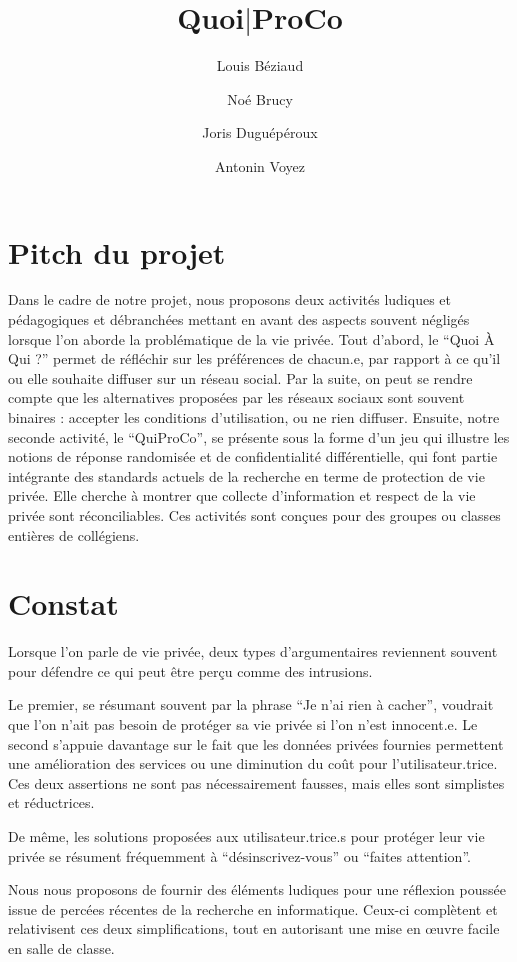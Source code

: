 \documentclass[a4paper]{article}
\title{\Huge\textbf{Quoi\(\mid\)ProCo}}
\author[1,2]{Louis Béziaud}
\author[1,2]{Noé Brucy}
\author[1,2]{Joris Duguépéroux}
\author[1]{Antonin Voyez}
\affil[1]{Université Rennes 1 \protect\\
  \texttt{prénom.nom@etudiant.univ-rennes1.fr}}
\affil[2]{École normale supérieure de Rennes \protect\\
  \texttt{prénom.nom@ens-rennes.fr}}
\affil[ ]{\par\emph{Joris Duguépéroux est porteur du projet}}
\date{}
\begin{document}
\maketitle

\section*{Pitch du projet}

Dans le cadre de notre projet, nous proposons deux activités ludiques et pédagogiques et débranchées mettant en avant des aspects souvent négligés lorsque l'on aborde la problématique de la vie privée.
Tout d'abord, le \enquote{Quoi À Qui ?} permet de réfléchir sur les préférences de chacun.e, par rapport à ce qu'il ou elle souhaite diffuser sur un réseau social. Par la suite, on peut se rendre compte que les alternatives proposées par les réseaux sociaux sont souvent binaires : accepter les conditions d'utilisation, ou ne rien diffuser.
Ensuite, notre seconde activité, le \enquote{QuiProCo}, se présente sous la forme d'un jeu qui illustre les notions de réponse randomisée et de confidentialité différentielle, qui font partie intégrante des standards actuels de la recherche en terme de protection de vie privée.
Elle cherche à montrer que collecte d'information et respect de la vie privée sont réconciliables.
Ces activités sont conçues pour des groupes ou classes entières de collégiens.


\section*{Constat}
Lorsque l'on parle de vie privée, deux types d'argumentaires reviennent souvent pour défendre ce qui peut être perçu comme des intrusions.

Le premier, se résumant souvent par la phrase \enquote{Je n'ai rien à cacher}, voudrait que l'on n'ait pas besoin de protéger sa vie privée si l'on n'est innocent.e.
Le second s'appuie davantage sur le fait que les données privées fournies permettent une amélioration des services ou une diminution du coût pour l'utilisateur.trice.
Ces deux assertions ne sont pas nécessairement fausses, mais elles sont simplistes et réductrices.

De même, les solutions proposées aux utilisateur.trice.s pour protéger leur vie privée se résument fréquemment à \enquote{désinscrivez-vous} ou \enquote{faites attention}.

Nous nous proposons de fournir des éléments ludiques pour une réflexion poussée issue de percées récentes de la recherche en informatique. Ceux-ci complètent et relativisent ces deux simplifications, tout en autorisant une mise en œuvre facile en salle de classe.
\end{document}
